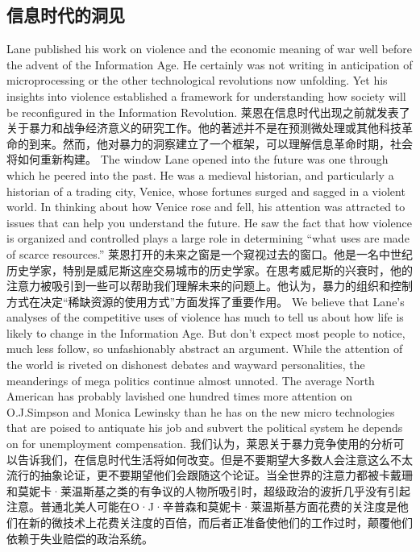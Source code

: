 \subsection{信息时代的洞见}
\begin{paracol}{2}
	Lane published his work on violence and the economic meaning of war well before the advent of the Information Age. He certainly was not writing in anticipation of microprocessing or the other technological revolutions now unfolding. Yet his insights into violence established a framework for understanding how society will be reconfigured in the Information Revolution.
	\switchcolumn
	莱恩在信息时代出现之前就发表了关于暴力和战争经济意义的研究工作。他的著述并不是在预测微处理或其他科技革命的到来。然而，他对暴力的洞察建立了一个框架，可以理解信息革命时期，社会将如何重新构建。
	\switchcolumn*
	The window Lane opened into the future was one through which he peered into the past. He was a medieval historian, and particularly a historian of a trading city, Venice, whose fortunes surged and sagged in a violent world. In thinking about how Venice rose and fell, his attention was attracted to issues that can help you understand the future. He saw the fact that how violence is organized and controlled plays a large role in determining ``what uses are made of scarce resources.''
	\switchcolumn
	莱恩打开的未来之窗是一个窥视过去的窗口。他是一名中世纪历史学家，特别是威尼斯这座交易城市的历史学家。在思考威尼斯的兴衰时，他的注意力被吸引到一些可以帮助我们理解未来的问题上。他认为，暴力的组织和控制方式在决定“稀缺资源的使用方式”方面发挥了重要作用。
	\switchcolumn*
	We believe that Lane's analyses of the competitive uses of violence has much to tell us about how life is likely to change in the Information Age. But don't expect most people to notice, much less follow, so unfashionably abstract an argument. While the attention of the world is riveted on dishonest debates and wayward personalities, the meanderings of mega politics continue almost unnoted. The average North American has probably lavished one hundred times more attention on O.J.Simpson and Monica Lewinsky than he has on the new micro technologies that are poised to antiquate his job and subvert the political system he depends on for unemployment compensation.
	\switchcolumn
	我们认为，莱恩关于暴力竞争使用的分析可以告诉我们，在信息时代生活将如何改变。但是不要期望大多数人会注意这么不太流行的抽象论证，更不要期望他们会跟随这个论证。当全世界的注意力都被卡戴珊和莫妮卡·莱温斯基之类的有争议的人物所吸引时，超级政治的波折几乎没有引起注意。普通北美人可能在O·J·辛普森和莫妮卡·莱温斯基方面花费的关注度是他们在新的微技术上花费关注度的百倍，而后者正准备使他们的工作过时，颠覆他们依赖于失业赔偿的政治系统。
\end{paracol}


